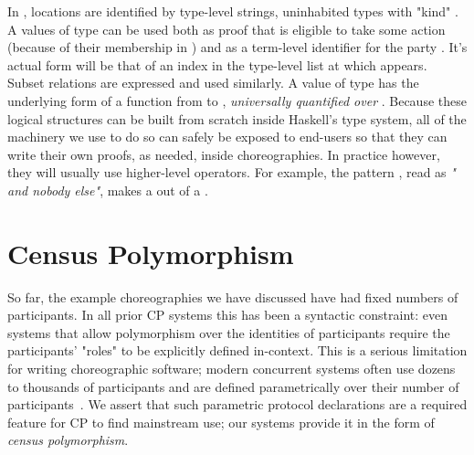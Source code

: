 In \MultiChor, locations are identified by type-level strings, uninhabited types with "kind" .
A values of type  can be used both
as proof that  is eligible to take some action (because of their membership in )
and as a term-level identifier for the party .
It's actual form will be that of an index in the type-level list  at which  appears.
Subset relations are expressed and used similarly.
A value of type  has the underlying form of a function
from  to ,
\emph{universally quantified over }.
Because these logical structures can be built from scratch inside Haskell's type system,
all of the machinery we use to do so can safely be exposed to end-users so that they can write their own proofs, as needed, inside choreographies.
In practice however, they will usually use higher-level operators.
For example, the pattern , read as \emph{" and nobody else"},
makes a  out of a .


\section{Census Polymorphism}
\label{sec:census-poly}

So far, the example choreographies we have discussed have had fixed numbers of participants.
In all prior CP systems this has been a syntactic constraint:
even systems that allow polymorphism over the identities of participants require the participants' "roles" to be explicitly defined in-context.
This is a serious limitation for writing choreographic software;
modern concurrent systems often use dozens to thousands of participants
and are defined parametrically over their number of participants~\cite{bigConcurrent1, corrigan2017prio, bigConcurrent3, bigConcurrent4, dprio2023}.
We assert that such parametric protocol declarations are a required feature for CP to find mainstream use;
our systems provide it in the form of \emph{census polymorphism}.

